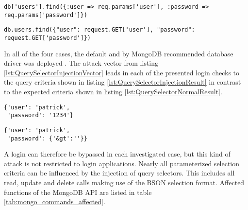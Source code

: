 \begin{lstlisting}[caption={Vulnerable Ruby example for query selector injection on MongoDB}, label={lst:RubyQuerySelectorInjection}]
db['users'].find({:user => req.params['user'], :password => req.params['password']})
\end{lstlisting}

\begin{lstlisting}[caption={Vulnerable Python example for query selector injection on MongoDB}, label={lst:PythonQuerySelectorInjection}]
db.users.find({"user": request.GET['user'], "password": request.GET['password']})
\end{lstlisting}

In all of the four cases, the default and by MongoDB recommended database driver was deployed \cite{MongoDB_Drivers2016}. The attack vector from listing \ref{lst:QuerySelectorInjectionVector} leads in each of the presented login checks to the query criteria shown in listing \ref{lst:QuerySelectorInjectionResult} in contrast to the expected criteria shown in listing \ref{lst:QuerySelectorNormalResult}. \\

\begin{minipage}{.97\textwidth}
\begin{minipage}[t]{.49\textwidth}
\begin{lstlisting}[caption={Resulting query of normal request}, label={lst:QuerySelectorNormalResult}]
{'user': 'patrick', 
 'password': '1234'}
\end{lstlisting}
\end{minipage}
\hfill
\begin{minipage}[t]{.49\textwidth}
\begin{lstlisting}[caption={Resulting query of query selector injection}, label={lst:QuerySelectorInjectionResult}]
{'user': 'patrick',
 'password': {'&gt':''}}
\end{lstlisting}
\end{minipage}
\end{minipage}

A login can therefore be bypassed in each investigated case, but this kind of attack is not restricted to login applications. Nearly all parameterized selection criteria can be influenced by the injection of query selectors. This includes all read, update and delete calls making use of the BSON selection format. Affected functions of the MongoDB API are listed in table \ref{tab:mongo_commands_affected}.\\

